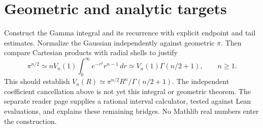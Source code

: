 \section{Geometric and analytic targets}
Construct the Gamma integral and its recurrence with explicit endpoint and
tail estimates. Normalize the Gaussian independently against geometric $\pi$.
Then compare Cartesian products with radial shells to justify
\[
 \pi^{n/2}\simeq nV_n(1)\int_0^\infty e^{-r^2}r^{n-1}\,dr
 \simeq V_n(1)\Gamma(n/2+1),\qquad n\ge1.
\]
This should establish $V_n(R)\simeq\pi^{n/2}R^n/\Gamma(n/2+1)$.
The independent coefficient cancellation above is not yet this integral or
geometric theorem. The separate reader page supplies a rational interval
calculator, tested against Lean evaluations, and explains these remaining
bridges. No Mathlib real numbers enter the construction.

